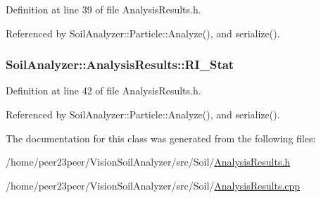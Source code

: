 Definition at line 39 of file Analysis\+Results.\+h.



Referenced by Soil\+Analyzer\+::\+Particle\+::\+Analyze(), and serialize().

\hypertarget{class_soil_analyzer_1_1_analysis_results_a3bbccb36afd62b9a35b7afa578c4919d}{}
\subsubsection[{R\+I\+\_\+\+Stat}]{ Soil\+Analyzer\+::\+Analysis\+Results\+::\+R\+I\+\_\+\+Stat}\label{class_soil_analyzer_1_1_analysis_results_a3bbccb36afd62b9a35b7afa578c4919d}


Definition at line 42 of file Analysis\+Results.\+h.



Referenced by Soil\+Analyzer\+::\+Particle\+::\+Analyze(), and serialize().



The documentation for this class was generated from the following files\+:\begin{DoxyCompactItemize}
\item 
/home/peer23peer/\+Vision\+Soil\+Analyzer/src/\+Soil/\hyperlink{_analysis_results_8h}{Analysis\+Results.\+h}\item 
/home/peer23peer/\+Vision\+Soil\+Analyzer/src/\+Soil/\hyperlink{_analysis_results_8cpp}{Analysis\+Results.\+cpp}\end{DoxyCompactItemize}
